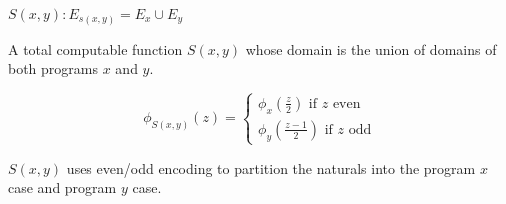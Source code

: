 \documentclass[fleqn]{article}
\begin{document}
$S(x, y): E_{s(x, y)} = E_x\cup E_y$

A total computable function $S(x, y)$ whose domain is the union of domains of both programs $x$ and $y$.

$$
\phi_{S(x, y)}(z) =
\begin{cases}
    \phi_x(\frac{z}{2}) \text{ if $z$ even} \\
    \phi_y(\frac{z - 1}{2}) \text{ if $z$ odd}
\end{cases}
$$

\bigskip

$S(x, y)$ uses even/odd encoding to partition the naturals into the program $x$ case and program $y$ case.
\end{document}
